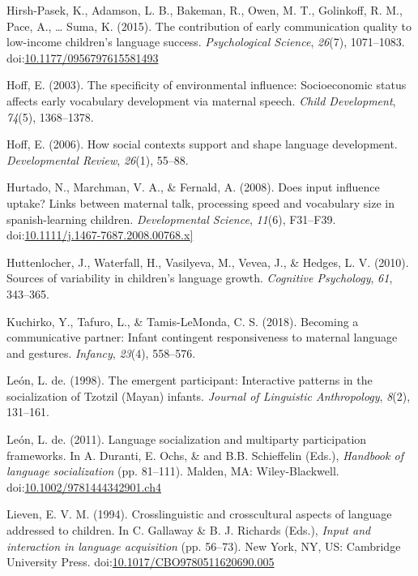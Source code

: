 \documentclass[floatsintext,man]{apa6}
\theoremstyle{definition}
\theoremstyle{definition}
\theoremstyle{definition}
\theoremstyle{remark}
\begin{document}
\hypertarget{ref-hirshpasek2015contribution}{}
Hirsh-Pasek, K., Adamson, L. B., Bakeman, R., Owen, M. T., Golinkoff, R.
M., Pace, A., \ldots{} Suma, K. (2015). The contribution of early
communication quality to low-income children's language success.
\emph{Psychological Science}, \emph{26}(7), 1071--1083.
doi:\href{https://doi.org/10.1177/0956797615581493}{10.1177/0956797615581493}

\hypertarget{ref-hoff2003specificity}{}
Hoff, E. (2003). The specificity of environmental influence:
Socioeconomic status affects early vocabulary development via maternal
speech. \emph{Child Development}, \emph{74}(5), 1368--1378.

\hypertarget{ref-hoff2006social}{}
Hoff, E. (2006). How social contexts support and shape language
development. \emph{Developmental Review}, \emph{26}(1), 55--88.

\hypertarget{ref-hurtado2008does}{}
Hurtado, N., Marchman, V. A., \& Fernald, A. (2008). Does input
influence uptake? Links between maternal talk, processing speed and
vocabulary size in spanish-learning children. \emph{Developmental
Science}, \emph{11}(6), F31--F39.
doi:\href{https://doi.org/10.1111/j.1467-7687.2008.00768.x\%5D}{10.1111/j.1467-7687.2008.00768.x{]}}

\hypertarget{ref-huttenlocher2010sources}{}
Huttenlocher, J., Waterfall, H., Vasilyeva, M., Vevea, J., \& Hedges, L.
V. (2010). Sources of variability in children's language growth.
\emph{Cognitive Psychology}, \emph{61}, 343--365.

\hypertarget{ref-kuchirko2017becoming}{}
Kuchirko, Y., Tafuro, L., \& Tamis-LeMonda, C. S. (2018). Becoming a
communicative partner: Infant contingent responsiveness to maternal
language and gestures. \emph{Infancy}, \emph{23}(4), 558--576.

\hypertarget{ref-deleon1998emergent}{}
León, L. de. (1998). The emergent participant: Interactive patterns in
the socialization of Tzotzil (Mayan) infants. \emph{Journal of
Linguistic Anthropology}, \emph{8}(2), 131--161.

\hypertarget{ref-deleon2011language}{}
León, L. de. (2011). Language socialization and multiparty participation
frameworks. In A. Duranti, E. Ochs, \& and B.B. Schieffelin (Eds.),
\emph{Handbook of language socialization} (pp. 81--111). Malden, MA:
Wiley-Blackwell.
doi:\href{https://doi.org/10.1002/9781444342901.ch4}{10.1002/9781444342901.ch4}

\hypertarget{ref-lieven1994crosslinguistic}{}
Lieven, E. V. M. (1994). Crosslinguistic and crosscultural aspects of
language addressed to children. In C. Gallaway \& B. J. Richards (Eds.),
\emph{Input and interaction in language acquisition} (pp. 56--73). New
York, NY, US: Cambridge University Press.
doi:\href{https://doi.org/10.1017/CBO9780511620690.005}{10.1017/CBO9780511620690.005}
\end{document}

